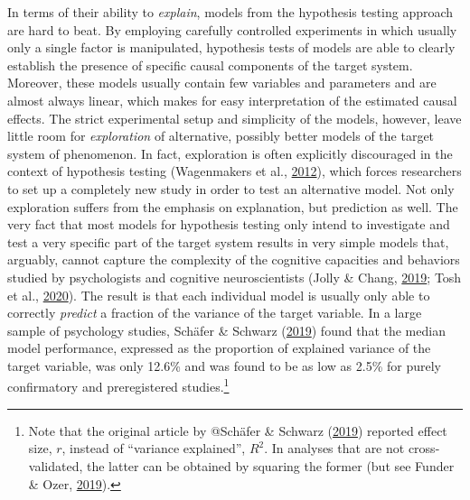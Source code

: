 \documentclass[11pt,american,a4paper,oneside,]{memoir} %
\let\rmarkdownfootnote\footnote%
\def\footnote{\protect\rmarkdownfootnote}
\begin{document}
In terms of their ability to \emph{explain}, models from the hypothesis testing approach are hard to beat. By employing carefully controlled experiments in which usually only a single factor is manipulated, hypothesis tests of models are able to clearly establish the presence of specific causal components of the target system. Moreover, these models usually contain few variables and parameters and are almost always linear, which makes for easy interpretation of the estimated causal effects. The strict experimental setup and simplicity of the models, however, leave little room for \emph{exploration} of alternative, possibly better models of the target system of phenomenon. In fact, exploration is often explicitly discouraged in the context of hypothesis testing (Wagenmakers et al., \protect\hyperlink{ref-Wagenmakers2012-vd}{2012}), which forces researchers to set up a completely new study in order to test an alternative model. Not only exploration suffers from the emphasis on explanation, but prediction as well. The very fact that most models for hypothesis testing only intend to investigate and test a very specific part of the target system results in very simple models that, arguably, cannot capture the complexity of the cognitive capacities and behaviors studied by psychologists and cognitive neuroscientists (Jolly \& Chang, \protect\hyperlink{ref-Jolly2019-lx}{2019}; Tosh et al., \protect\hyperlink{ref-Tosh2020-sf}{2020}). The result is that each individual model is usually only able to correctly \emph{predict} a fraction of the variance of the target variable. In a large sample of psychology studies, Schäfer \& Schwarz (\protect\hyperlink{ref-Schafer2019-ue}{2019}) found that the median model performance, expressed as the proportion of explained variance of the target variable, was only 12.6\% and was found to be as low as 2.5\% for purely confirmatory and preregistered studies.\footnote{Note that the original article by @Schäfer \& Schwarz (\protect\hyperlink{ref-Schafer2019-ue}{2019}) reported effect size, \(r\), instead of ``variance explained'', \(R^{2}\). In analyses that are not cross-validated, the latter can be obtained by squaring the former (but see Funder \& Ozer, \protect\hyperlink{ref-Funder2019-ow}{2019}).}
\end{document}
